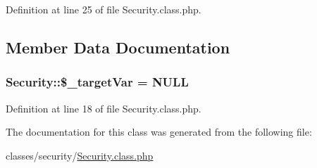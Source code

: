 Definition at line 25 of file Security.\+class.\+php.



\subsection{Member Data Documentation}
\hypertarget{classSecurity_a28ff37b08bd7a592552cf5af13f7ac74}{}
\subsubsection[{\$\+\_\+target\+Var}]{\setlength{\rightskip}{0pt plus 5cm}Security\+::\$\+\_\+target\+Var = N\+U\+L\+L}\label{classSecurity_a28ff37b08bd7a592552cf5af13f7ac74}


Definition at line 18 of file Security.\+class.\+php.



The documentation for this class was generated from the following file\+:\begin{DoxyCompactItemize}
\item 
classes/security/\hyperlink{Security_8class_8php}{Security.\+class.\+php}\end{DoxyCompactItemize}
